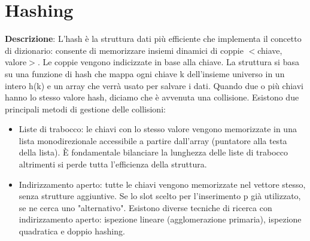\documentclass[../cheatSheetAlgoritmi.tex]{subfiles}
\begin{document}
\chapter{Hashing}
\textbf{Descrizione}: L'hash è la struttura dati più efficiente che implementa il concetto di dizionario: consente di memorizzare insiemi dinamici di coppie $<$chiave, valore$>$. Le coppie vengono indicizzate in base alla chiave. La struttura si basa su una funzione di hash che mappa ogni chiave k dell'insieme universo in un intero h(k)
e un array  che verrà usato per salvare i dati. Quando due o più chiavi hanno lo stesso valore hash, diciamo che è avvenuta una collisione. Esistono due principali metodi di gestione delle collisioni: 
\begin{itemize}
 	\item Liste di trabocco: le chiavi con lo stesso valore vengono memorizzate in una lista monodirezionale accessibile a partire dall'array (puntatore alla testa della lista). È fondamentale bilanciare la lunghezza delle liste di trabocco altrimenti si perde tutta l'efficienza della struttura. 
 	\item Indirizzamento aperto: tutte le chiavi vengono memorizzate nel vettore stesso, senza strutture aggiuntive. Se lo slot scelto per l'inserimento p già utilizzato, se ne cerca uno "alternativo". Esistono diverse tecniche di ricerca con indirizzamento aperto: ispezione lineare (agglomerazione primaria), ispezione quadratica e doppio hashing. 
\end{itemize}
\end{document}
